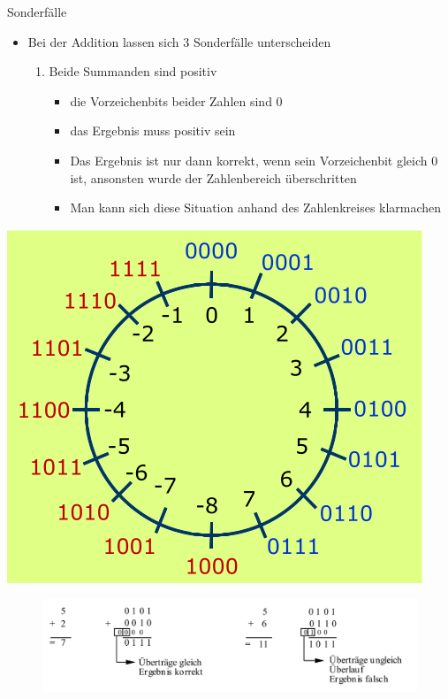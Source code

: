 \documentclass[12pt%
,xcolor=table
,aspectratio=169%
]{beamer}
\begin{document}
\begin{frame}{Sonderfälle}
  \begin{itemize}
	\item Bei der Addition lassen sich 3 Sonderfälle unterscheiden
	\begin{enumerate}
		\item Beide Summanden sind positiv
		\begin{itemize}
			\item die Vorzeichenbits beider Zahlen sind 0
			\item das Ergebnis muss positiv sein
			\item Das Ergebnis ist nur dann korrekt, wenn sein Vorzeichenbit gleich 0 ist, ansonsten wurde der Zahlenbereich überschritten
			\item Man kann sich diese Situation anhand des Zahlenkreises klarmachen
		\end{itemize}
	\end{enumerate}
\end{itemize}
\endminipage\hfill
{}%
  \includegraphics[scale=0.3]{pictures/sub1}
\endminipage
\begin{figure}
\includegraphics[scale=0.27]{pictures/sub2}
\end{figure}
\end{frame}
\end{document}
